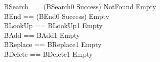 \begin{zed}
  BSearch == (BSearch0 \land Success) \lor NotFound \lor Empty \\
  BEnd == (BEnd0 \land Success) \lor Empty \\
  BLookUp == BLookUp1 \lor Empty \\
  BAdd == BAdd1 \lor Empty \\
  BReplace == BReplace1 \lor Empty \\
  BDelete == BDelete1 \lor Empty
\end{zed}
